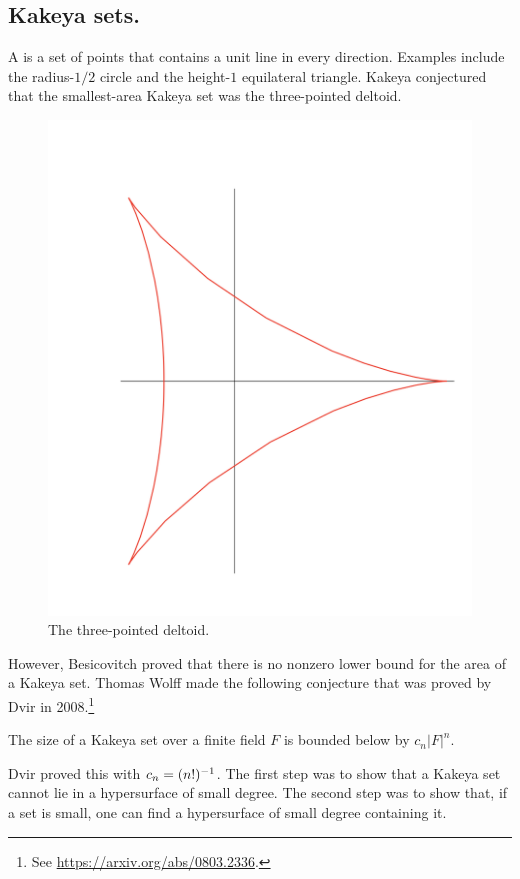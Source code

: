 \documentclass [11 pt, oneside] {article}
\begin{document}
\subsection{Kakeya sets.}
A  is a set of points that contains a unit line in every direction. Examples include the radius-$1/2$ circle and the height-$1$ equilateral triangle. Kakeya conjectured that the smallest-area Kakeya set was the three-pointed deltoid.

\begin{figure}
	\begin{center}
		\includegraphics[scale=0.4]{images/kakeya_deltoid}
		\caption{The three-pointed deltoid.}
	\end{center}
\end{figure}

However, Besicovitch proved that there is no nonzero lower bound for the area of a Kakeya set. Thomas Wolff made the following conjecture that was proved by Dvir in 2008.\footnote{See \url{https://arxiv.org/abs/0803.2336}.}
\begin{theorem}\label{}\index{}
The size of a Kakeya set over a finite field $F$ is bounded below by $c_n\left\lvert F \right\rvert ^n$.
\end{theorem}
Dvir proved this with $c_n = (n!)^{-1}$. The first step was to show that a Kakeya set cannot lie in a hypersurface of small degree. The second step was to show that, if a set is small, one can find a hypersurface of small degree containing it.
\end{document}
